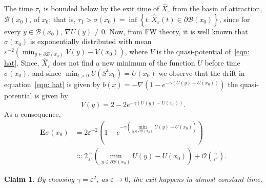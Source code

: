 \documentclass{amsproc}
\newtheorem{claim}[theorem]{Claim}
\newcommand{\E}{\mathbf{E}}
\newcommand{\eps}{\varepsilon}
\newcommand{\hatx}{\hat X_\eps}
\begin{document}
The time $\tau_1$ is bounded below by the exit time of $\hatx$ from the basin of attraction, $\mathcal{B}(x_0)$, of $x_0$; that is,  
$\tau_1 > \sigma(x_0) = \inf \left \{ t: \hatx(t) \in \partial \mathcal{B}(x_0) \right \}$, since for every $y \in \mathcal{B}(x_0)$, $\nabla U(y)\not = 0$.  Now, from FW theory, it is well known that $\sigma(x_0)$ is exponentially distributed with mean $\eps^{-2} \left( \min_{ y \in \partial \mathcal{B}(x_0) } V(y) - V(x_0) \right )$, where $V$ is the quasi-potential of~\eqref{eqn: hat}. Since, $\hatx$ does not find a new minimum of the function $U$ before time $\sigma(x_0)$, and since $\min_{t>0} U(S^t x_0) = U(x_0)$ we observe that the drift in equation~\eqref{eqn: hat} is given by $b(x) = -\nabla \left( 1 -  e^{ -\gamma \left (  U(y) - U(x_0)  \right ) } \right)$ the quasi-potential is given by 
\[
V(y) = 2 - 2e^{ -\gamma \left (  U(y) - U(x_0)  \right ) }.
\]
As a consequence, 
\begin{align*}
\E \sigma(x_0) &= 2\eps^{-2}\left( 1 -  e^{ -\gamma \left (  \min_{ y \in \partial \mathcal{B}(x_0) } U(y) - U(x_0)  \right ) }  \right) \\
&\approx 2\frac{\gamma}{\eps^2} \left (  \min_{ y \in \partial \mathcal{B}(x_0) } U(y) - U(x_0)  \right ) + \mathcal{O}\left(\frac{\gamma}{\eps^2} \right).
\end{align*}

\begin{claim}
By choosing $\gamma = \eps^2$, as $\eps \to 0$, the exit happens in almost constant time.
\end{claim}
\end{document}
